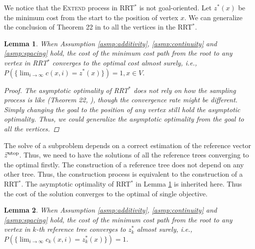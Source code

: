 \documentclass{article}
\newtheorem{lem}{Lemma}
\begin{document}
We notice that the \textsc{Extend} process in RRT$^{*}$ is not goal-oriented.
Let $ z^{*}(x) $ be the minimum cost from the start to the position of vertex $ x $.
We can generalize the conclusion of Theorem 22 in \cite{Karaman.Frazzoli:RSS10} to all the vertices in the RRT$^{*}$.
\begin{lem}
\label{lem:tree_vex:conv}
When Assumption \ref{asmp:additivity}, \ref{asmp:continuity} and \ref{asmp:spacing} hold,
the cost of the minimum cost path from the root to any vertex in RRT$^{*}$ converges to the optimal cost almost surely, i.e.,
$
P( \{ \lim_{ i \rightarrow \infty } c(x, i)  = z^{*}(x) \} ) = 1, x \in V $.
\begin{proof}
The asymptotic optimality of RRT$^{*}$ does not rely on how the sampling process is like (Theorem 22, \cite{Karaman.Frazzoli:RSS10}), though the convergence rate might be different.
Simply changing the goal to the position of any vertex still hold the asymptotic optimality.
Thus, we could generalize the asymptotic optimality from the goal to all the vertices.
\end{proof}
\end{lem}

The solve of a subproblem depends on a correct estimation of the reference vector $ \vec{z}^{\rm utop} $.
Thus, we need to have the solutions of all the reference trees converging to the optimal firstly.
The construction of a reference tree does not depend on any other tree.
Thus, the construction process is equivalent to the construction of a RRT$^{*}$.
The asymptotic optimality of RRT$^{*}$ in Lemma \ref{lem:tree_vex:conv} is inherited here.
Thus the cost of the solution converges to the optimal of single objective.
\begin{lem}
\label{lem:ref_tree:conv}
When Assumption \ref{asmp:additivity}, \ref{asmp:continuity} and \ref{asmp:spacing} hold,
the cost of the minimum cost path from the root to any vertex in $ k $-th reference tree converges to $ z^{*}_{k} $ almost surely, i.e., 
$ P( \{ \lim_{ i \rightarrow \infty }  c_{k} (x, i ) = z^{*}_{k} (x) \} ) = 1  $.
\end{lem}
\end{document}
